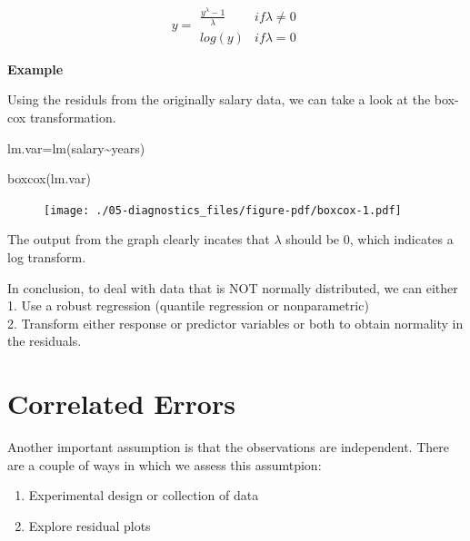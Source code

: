 \documentclass[
  letterpaper,
  DIV=11,
  numbers=noendperiod]{scrreprt}
\newenvironment{Shaded}{\begin{snugshade}}{\end{snugshade}}
\newcommand{\FunctionTok}[1]{\textcolor[rgb]{0.28,0.35,0.67}{#1}}
\newcommand{\NormalTok}[1]{\textcolor[rgb]{0.00,0.23,0.31}{#1}}
\newcommand{\OtherTok}[1]{\textcolor[rgb]{0.00,0.23,0.31}{#1}}
\newcommand{\SpecialCharTok}[1]{\textcolor[rgb]{0.37,0.37,0.37}{#1}}
\providecommand{\tightlist}{%
  \setlength{\itemsep}{0pt}\setlength{\parskip}{0pt}}\usepackage{longtable,booktabs,array}
\begin{document}
\[y = \begin{array}
{rr}
\frac{y^{\lambda}-1}{\lambda} & if \lambda \ne 0  \\
log(y) & if \lambda = 0 
\end{array}\]

\textbf{Example}

Using the residuls from the originally salary data, we can take a look
at the box-cox transformation.

\begin{Shaded}
\begin{Highlighting}[]
\NormalTok{lm.var}\OtherTok{=}\FunctionTok{lm}\NormalTok{(salary}\SpecialCharTok{\textasciitilde{}}\NormalTok{years)}

\FunctionTok{boxcox}\NormalTok{(lm.var)}
\end{Highlighting}
\end{Shaded}

\begin{figure}[H]

{\centering \texttt{[image: ./05-diagnostics\_files/figure-pdf/boxcox-1.pdf]}

}

\end{figure}

The output from the graph clearly incates that \(\lambda\) should be 0,
which indicates a log transform.

In conclusion, to deal with data that is NOT normally distributed, we
can either\\
1. Use a robust regression (quantile regression or nonparametric)\\
2. Transform either response or predictor variables or both to obtain
normality in the residuals.\\

\hypertarget{correlated-errors}{%
\section{Correlated Errors}\label{correlated-errors}}

Another important assumption is that the observations are independent.
There are a couple of ways in which we assess this assumtpion:\\

\begin{enumerate}
\def\labelenumi{\arabic{enumi}.}
\tightlist
\item
  Experimental design or collection of data\\
\item
  Explore residual plots\\
\end{enumerate}
\end{document}

